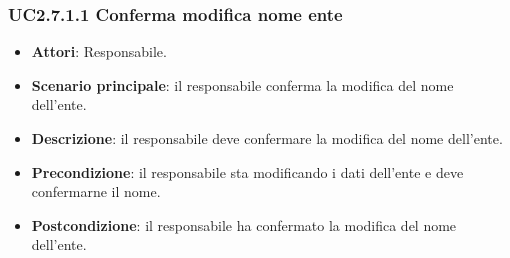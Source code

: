 \subsubsection{UC2.7.1.1 Conferma modifica nome ente}
\begin{itemize}
\item \textbf{Attori}: Responsabile.
\item \textbf{Scenario principale}: il responsabile conferma la modifica del nome dell'ente.
\item \textbf{Descrizione}: il responsabile deve confermare la modifica del nome dell'ente.
\item \textbf{Precondizione}: il responsabile sta modificando i dati dell'ente e deve confermarne il nome.
\item \textbf{Postcondizione}: il responsabile ha confermato la modifica del nome dell'ente.
\end{itemize}
